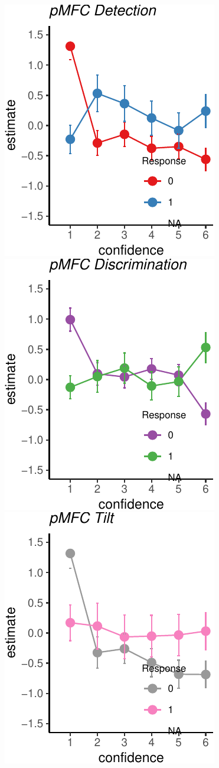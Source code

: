 \documentclass[]{article}
\begin{document}
\includegraphics{Chudi-Thesis_files/figure-latex/mixed_effects-7.pdf}
\includegraphics{Chudi-Thesis_files/figure-latex/mixed_effects-8.pdf}
\includegraphics{Chudi-Thesis_files/figure-latex/mixed_effects-9.pdf}
\end{document}

